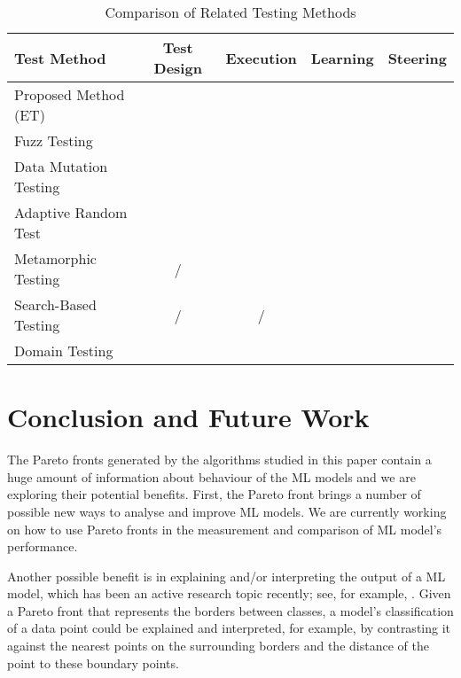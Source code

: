 \documentclass[preprint,1p,authoryear,times]{elsarticle}
\newcommand{\xmark}{\ding{55}}%
\newcommand{\cmark}{\ding{51}}%
\begin{document}
\begin{table}[h]
\caption{Comparison of Related Testing Methods}\label{tab:ComparisonTestMethod}
\begin{small}
\begin{center}
\begin{tabular}{|l|c|c|c|c|}
\hline
\textbf{Test Method} & \textbf{Test Design} & \textbf{Execution} & \textbf{Learning} & \textbf{Steering} \\ \hline\hline 
Proposed Method (ET)	&\cmark	&\cmark	&\cmark	&\cmark\\\hline
Fuzz Testing 		&\xmark 		&\cmark 	&\xmark 		&\xmark \\ \hline
Data Mutation Testing &\cmark &\cmark &\xmark 	&\xmark\\ \hline
Adaptive Random Test	 &\xmark		&\xmark		&\xmark		&\cmark\\\hline 
Metamorphic Testing	&\xmark/\cmark	 &\cmark		&\xmark	&\cmark\\\hline 
Search-Based Testing	&\xmark/\cmark 	&\xmark/\cmark	&\xmark	&\cmark\\\hline 
Domain Testing 		&\xmark 		&\xmark 		&\xmark 		&\xmark \\\hline
\end{tabular} 
\end{center}
\end{small}
\end{table} 

\section{Conclusion and Future Work} \label{sec:Conclusion}

The Pareto fronts generated by the algorithms studied in this paper contain a huge amount of information about behaviour of the ML models and we are exploring their potential benefits.  First, the Pareto front brings a number of possible new ways to analyse and improve ML models. We are currently working on how to use Pareto fronts in the measurement and comparison of ML model's performance. 

Another possible benefit is in explaining and/or interpreting the output of a ML model, which has been an active research topic recently; see, for example, \citep{Linardatos_et_al2021, Molnar2021}. Given a Pareto front that represents the borders between classes, a model's classification of a data point could be explained and interpreted, for example, by contrasting it against the nearest points on the surrounding borders and the distance of the point to these boundary points.  
\end{document}
